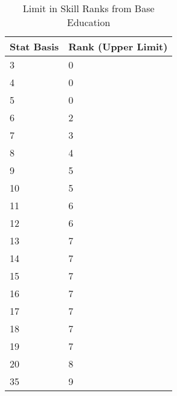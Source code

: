 
\begin{table}[htb]
\centering
\caption{Limit in Skill Ranks from Base Education}
	\begin{tabular}{||l|l||} \hline
	Stat Basis & Rank (Upper Limit) \\ \hline
	3          & 0 \\
	4          & 0 \\
    5          & 0 \\
    6          & 2 \\     	
    7          & 3 \\
    8          & 4 \\
    9          & 5 \\
    10         & 5 \\
    11         & 6 \\
    12         & 6 \\
    13         & 7 \\
    14         & 7 \\
    15         & 7 \\
    16         & 7 \\
    17         & 7 \\
    18         & 7 \\
    19         & 7 \\
    20         & 8 \\
    35         & 9 \\ \hline
	\end{tabular}
\end{table}
